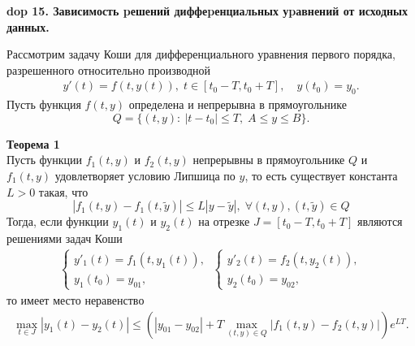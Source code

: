 \setcounter{section}{4}
\setcounter{subsection}{15}
\setcounter{equation}{0}
\textbf{\LARGE dop 15. Зависимость pешений диффеpенциальных уpавнений от исходных данных.}

Рассмотрим задачу Коши для дифференциального уравнения первого порядка, разрешенного относительно производной
\begin{equation*}
\begin{split}
y'(t)=f(t,y(t)), \; t\in [t_0-T,t_0+T],\quad y(t_0)=y_0.
\end{split}
\end{equation*}
Пусть функция $f(t,y)$ определена и непрерывна в прямоугольнике
\begin{equation*}
Q=\{(t,y):\: |t-t_0|\leq T,\; A\leq y\leq B\}.
\end{equation*}

\textbf{Теорема 1}\\
Пусть функции $f_1 (t,y)$ и $f_2 (t,y)$ непрерывны в прямоугольнике $Q$ и $f_1 (t,y)$ удовлетворяет условию Липшица по $y$, то есть существует константа  $L > 0$ такая, что
\begin{equation*}
|f_1(t,y)-f_1(t,\widetilde{y})|\leq L|y-\widetilde{y}|,\; \forall(t,y), (t,\widetilde{y})\in Q
\end{equation*}
Тогда, если функции $y_1(t)$ и $y_2(t)$ на отрезке $J = [t_0-T,t_0+T]$ являются решениями задач Коши 
\begin{equation*}
\begin{split}
\begin{cases}
y'_1(t)=f_1(t,y_1(t)),\\
y_1(t_0)=y_{01},
\end{cases}
\:
\begin{cases}
y'_2(t)=f_2(t,y_2(t)),\\
y_2(t_0)=y_{02},
\end{cases}
\end{split}
\end{equation*}
то имеет место неравенство 
\begin{equation*}\tag{1}
\begin{split}
\max_{t \in J} |y_1(t)-y_2(t)|
\leq ( |y_{01}-y_{02}|+T \max_{(t,y)\in Q} |f_1(t,y)-f_2(t,y)|) e^{LT}.
\end{split}
\end{equation*}


